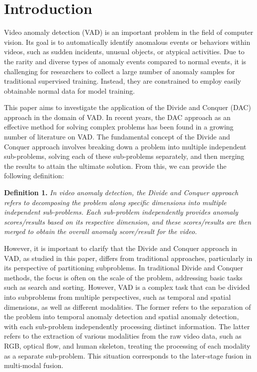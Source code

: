 \documentclass[conference]{IEEEtran}
\begin{document}
\section{Introduction}
Video anomaly detection (VAD) is an important problem in the field of computer vision. Its goal is to automatically identify anomalous events or behaviors within videos, such as sudden incidents, unusual objects, or atypical activities. Due to the rarity and diverse types of anomaly events compared to normal events, it is challenging for researchers to collect a large number of anomaly samples for traditional supervised training. Instead, they are constrained to employ easily obtainable normal data for model training.

This paper aims to investigate the application of the Divide and Conquer (DAC) approach in the domain of VAD. In recent years, the DAC approach as an effective method for solving complex problems has been found in a growing number of literature on VAD. The fundamental concept of the Divide and Conquer approach involves breaking down a problem into multiple independent sub-problems, solving each of these sub-problems separately, and then merging the results to attain the ultimate solution. From this, we can provide the following definition:

\noindent
\textbf{Definition 1.} \textit{In video anomaly detection, the Divide and Conquer approach refers to decomposing the problem along specific dimensions into multiple independent sub-problems. Each sub-problem independently provides anomaly scores/results based on its respective dimension, and these scores/results are then merged to obtain the overall anomaly score/result for the video.}

However, it is important to clarify that the Divide and Conquer approach in VAD, as studied in this paper, differs from traditional approaches, particularly in its perspective of partitioning subproblems. In traditional Divide and Conquer methods, the focus is often on the scale of the problem, addressing basic tasks such as search and sorting. However, VAD is a complex task that can be divided into subproblems from multiple perspectives, such as temporal and spatial dimensions, as well as different modalities. The former refers to the separation of the problem into temporal anomaly detection and spatial anomaly detection, with each sub-problem independently processing distinct information. The latter refers to the extraction of various modalities from the raw video data, such as RGB, optical flow, and human skeleton, treating the processing of each modality as a separate sub-problem. This situation corresponds to the later-stage fusion in multi-modal fusion\cite{baltruvsaitis2018multimodal}.
\end{document}
